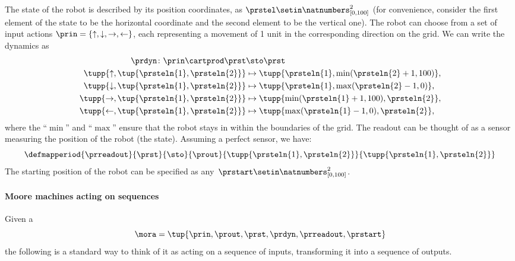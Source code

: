 \begin{example}
    The state of the robot is described by its position coordinates, as $\prstel \setin \natnumbers^2_{[0,100]}$ (for convenience, consider the first element of the state to be the horizontal coordinate and the second element to be the vertical one).
    The robot can choose from a set of input actions $\prin=\{\uparrow, \downarrow,\rightarrow,\leftarrow\}$, each representing a movement of 1 unit in the corresponding direction on the grid.
    We can write the dynamics as
    \begin{equation}
        \begin{aligned}
            \prdyn\colon \prin \cartprod \prst                & \sto \prst \\
            \tupp{\uparrow, \tup{\prsteln{1},\prsteln{2}}}    & \mapsto \tupp{\prsteln{1}, \min(\prsteln{2}+1,100)}, \\
            \tupp{\downarrow, \tup{\prsteln{1},\prsteln{2}}}  & \mapsto \tupp{\prsteln{1}, \max(\prsteln{2}-1,0)}, \\
            \tupp{\rightarrow, \tup{\prsteln{1},\prsteln{2}}} & \mapsto \tupp{\min(\prsteln{1}+1,100), \prsteln{2}}, \\
            \tupp{\leftarrow, \tup{\prsteln{1},\prsteln{2}}}  & \mapsto \tupp{\max(\prsteln{1}-1,0), \prsteln{2}}, \\
        \end{aligned}
    \end{equation}
    where the ``$\min$'' and ``$\max$'' ensure that the robot stays in within the boundaries of the grid.
    The readout can be thought of as a sensor measuring the position of the robot (the state).
    Assuming a perfect sensor, we have:
    \begin{equation*}
        \defmapperiod{\prreadout}
        {\prst}
        {\sto}
        {\prout}
        {\tupp{\prsteln{1},\prsteln{2}}}
        {\tupp{\prsteln{1},\prsteln{2}}}
    \end{equation*}
    The starting position of the robot can be specified as any~$\prstart\setin \natnumbers^2_{[0,100]}$.
\end{example}



\paragraph{Moore machines acting on sequences}

Given a ~
\begin{equation}
\mora = \tup{\prin, \prout, \prst, \prdyn, \prreadout, \prstart}
\end{equation}
the following is a standard way to think of it as acting on a sequence of inputs, transforming it into a sequence of outputs.

